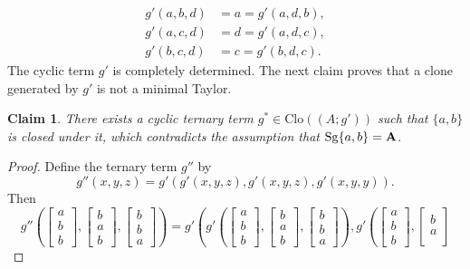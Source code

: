 \documentclass[11pt]{amsart}
\newcommand{\m}[1]{\mathbf{\uppercase{#1}}}
\theoremstyle{definition}
\theoremstyle{remark}
\theoremstyle{plain}
\newtheorem{claim}[thm]{Claim}
\begin{document}
\begin{enumerate}[wide, labelindent=0pt]
\begin{enumerate}[wide, labelindent=0pt]
   \begin{align*}
       g'(a,b,d)&=a=g'(a,d,b),\\
       g'(a,c,d)&=d=g'(a,d,c),\\
       g'(b,c,d)&=c=g'(b,d,c).
   \end{align*}
   The cyclic term $g'$ is completely determined. The next claim proves that a clone generated by $g'$ is not a minimal Taylor.
   \begin{claim}
There exists a cyclic ternary term $g^*\in\mathrm{Clo}((A;g'))$ such that $\{a,b\}$ is closed under it, which contradicts the assumption that $\mathrm{Sg}\{a,b\}=\m a$.
\end{claim}
   
\begin{proof}
Define the ternary term $g''$ by $$g''(x,y,z)=g'(g'(x,y,z),g'(x,y,z),g'(x,y,y)).$$ Then
\begin{equation}\label{eq for g''}
g''\left(
\begin{bmatrix}
a \\
b \\
b
\end{bmatrix}\!,\!
\begin{bmatrix}
b \\
a \\
b
\end{bmatrix}\!,\!
\begin{bmatrix}
b \\
b \\
a
\end{bmatrix}
\right) =g'\left(
g'\left(
\begin{bmatrix}
a \\
b \\
b
\end{bmatrix}\!,\! 
\begin{bmatrix}
b \\
a \\
b
\end{bmatrix}\!,\!
\begin{bmatrix}
b \\
b \\
a
\end{bmatrix}
\right)\!,
g'\left(
\begin{bmatrix}
a \\
b \\
b
\end{bmatrix}\!,\! 
\begin{bmatrix}
b \\
a \\

\end{bmatrix}
\end{equation}
\end{proof}
\end{enumerate}
\end{enumerate}
\end{document}

